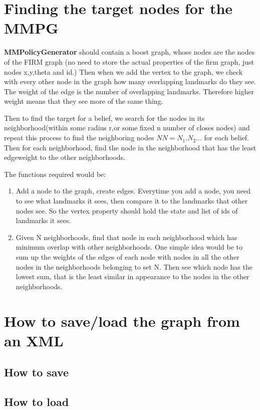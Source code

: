 \section{Finding the target nodes for the MMPG}

\textbf{MMPolicyGenerator} should contain a boost graph, whose nodes are the nodes of the FIRM graph (no need to store the
actual properties of the firm graph, just nodes x,y,theta and id.) Then when we add
the vertex to the graph, we check with every other node in the graph how many overlapping
landmarks do they see. The weight of the edge is the number of overlapping landmarks.
Therefore higher weight means that they see more of the same thing.

Then to find the target for a belief, we search for the nodes in its neighborhood(within some radius r,or some fixed
n number of closes nodes) and repeat this process to find the neighboring nodes $NN= {N_1.N_2...}$ for each belief.
Then for each neighborhood, find the node in the neighborhood that has the least edgeweight to the other neighborhoods.


The functions required would be:

\begin{enumerate}
 \item Add a node to the graph, create edges. Everytime you add a node, you need to see what landmarks it sees, then compare it to the landmarks
      that other nodes see. So the vertex property should hold the state and list of ids of landmarks it sees.
 \item Given N neighborhoods, find that node in each neighborhood which has minimum overlap with other neighborhoods. One simple idea would be 
       to sum up the weights of the edges of each node with nodes in all the other nodes in the neighborhoods belonging to set N. Then
       see which node has the lowest sum, that is the least similar in appearance to the nodes in the other neighborhoods.
\end{enumerate}

\section{How to save/load the graph from an XML}

\subsection{How to save}

\subsection{How to load}

